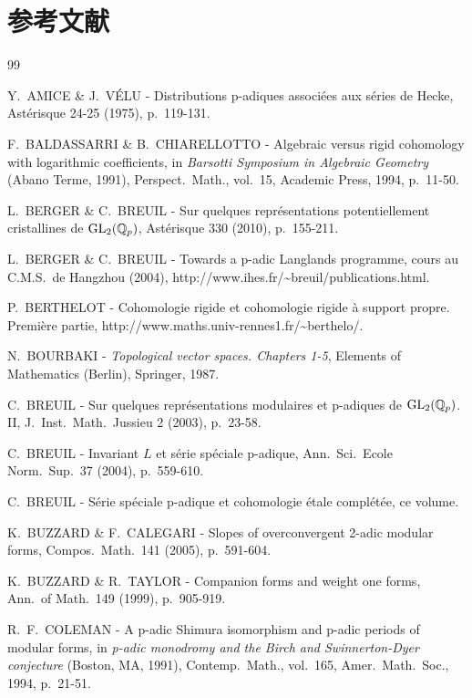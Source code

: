 
\section*{参考文献}\label{sec:references}

\begin{thebibliography}{99}

 Y.~AMICE \& J.~V\'ELU - Distributions p-adiques associ\'ees aux s\'eries de Hecke, Ast\'erisque 24-25 (1975), p.~119-131.

 F.~BALDASSARRI \& B.~CHIARELLOTTO - Algebraic versus rigid cohomology with logarithmic coefficients, in \emph{Barsotti Symposium in Algebraic Geometry} (Abano Terme, 1991), Perspect.\ Math., vol.~15, Academic Press, 1994, p.~11-50.

 L.~BERGER \& C.~BREUIL - Sur quelques repr\'esentations potentiellement cristallines de $\mathrm{GL}_2(\mathbb{Q}_p)$, Ast\'erisque 330 (2010), p.~155-211.

 L.~BERGER \& C.~BREUIL - Towards a p-adic Langlands programme, cours au C.M.S.\ de Hangzhou (2004), http://www.ihes.fr/\textasciitilde breuil/publications.html.

 P.~BERTHELOT - Cohomologie rigide et cohomologie rigide \`a support propre. Premi\`ere partie, http://www.maths.univ-rennes1.fr/\textasciitilde berthelo/.

 N.~BOURBAKI - \emph{Topological vector spaces. Chapters 1-5}, Elements of Mathematics (Berlin), Springer, 1987.

 C.~BREUIL - Sur quelques repr\'esentations modulaires et p-adiques de $\mathrm{GL}_2(\mathbb{Q}_p)$. II, J.\ Inst.\ Math.\ Jussieu 2 (2003), p.~23-58.

 C.~BREUIL - Invariant $L$ et s\'erie sp\'eciale p-adique, Ann.\ Sci.\ Ecole Norm.\ Sup.\ 37 (2004), p.~559-610.

 C.~BREUIL - S\'erie sp\'eciale p-adique et cohomologie \'etale compl\'et\'ee, ce volume.

 K.~BUZZARD \& F.~CALEGARI - Slopes of overconvergent 2-adic modular forms, Compos.\ Math.\ 141 (2005), p.~591-604.

 K.~BUZZARD \& R.~TAYLOR - Companion forms and weight one forms, Ann.\ of Math.\ 149 (1999), p.~905-919.

 R.~F.~COLEMAN - A p-adic Shimura isomorphism and p-adic periods of modular forms, in \emph{p-adic monodromy and the Birch and Swinnerton-Dyer conjecture} (Boston, MA, 1991), Contemp.\ Math., vol.~165, Amer.\ Math.\ Soc., 1994, p.~21-51.


\end{thebibliography}
